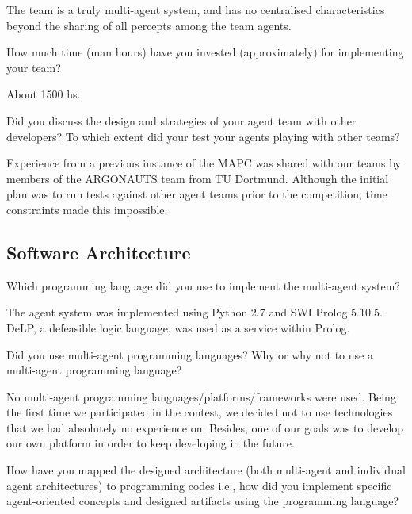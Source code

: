 The team is a truly multi-agent system, and has no centralised characteristics
beyond the sharing of all percepts among the team agents.

\begin{question}
How much time (man hours) have you invested (approximately) for implementing
your team?  
\end{question}


About 1500 hs.

\begin{question}
Did you discuss the design and strategies of your agent team with other
developers? To which extent did your test your agents playing with other teams?
\end{question}

Experience from a previous instance of the MAPC was shared with our teams by
members of the ARGONAUTS team from TU Dortmund\cite{Holzgen:2011}.  Although the
initial plan was to run tests against other agent teams prior to the
competition, time constraints made this impossible.

\subsection{Software Architecture}
\setcounter{question}{0}

\begin{question}
Which programming language did you use to implement the multi-agent system?  
\end{question}

The agent system was implemented using Python 2.7 and SWI Prolog 5.10.5. DeLP,
a defeasible logic language, was used as a service within Prolog.

\begin{question}
Did you use multi-agent programming languages? Why or why not to use
a multi-agent programming language?  
\end{question}

No multi-agent programming languages/platforms/frameworks were used. Being the
first time we participated in the contest, we decided not to use technologies
that we had absolutely no experience on. Besides, one of our goals was to
develop our own platform in order to keep developing in the future.

\begin{question}
How have you mapped the designed architecture (both multi-agent and individual
agent architectures) to programming codes i.e., how did you implement specific
agent-oriented concepts and designed artifacts using the programming language?  
\end{question}

